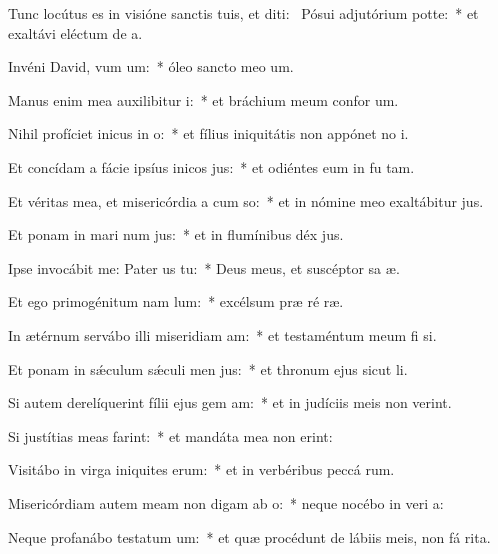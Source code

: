 \item Tunc locútus es in visióne sanctis tuis, et diti:~\pscross{} Pósui adjutórium  potte:~* et exaltávi eléctum de  a.
\item Invéni David, vum um:~* óleo sancto meo  um.
\item Manus enim mea auxilibitur i:~* et bráchium meum confor um.
\item Nihil profíciet inicus in o:~* et fílius iniquitátis non appónet no i.
\item Et concídam a fácie ipsíus inicos jus:~* et odiéntes eum in fu tam.
\item Et véritas mea, et misericórdia a cum so:~* et in nómine meo exaltábitur  jus.
\item Et ponam in mari num jus:~* et in flumínibus déx jus.
\item Ipse invocábit me: Pater us  tu:~* Deus meus, et suscéptor sa æ.
\item Et ego primogénitum nam lum:~* excélsum præ ré ræ.
\item In ætérnum servábo illi miseridiam am:~* et testaméntum meum fi si.
\item Et ponam in sǽculum sǽculi men jus:~* et thronum ejus sicut  li.
\item Si autem derelíquerint fílii ejus gem am:~* et in judíciis meis non verint.
\item Si justítias meas farint:~* et mandáta mea non erint:
\item Visitábo in virga iniquites erum:~* et in verbéribus peccá rum.
\item Misericórdiam autem meam non digam ab o:~* neque nocébo in veri a:
\item Neque profanábo testatum um:~* et quæ procédunt de lábiis meis, non fá rita.
